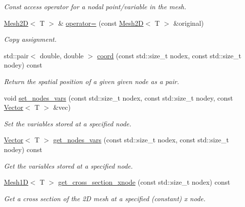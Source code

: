 \begin{DoxyCompactItemize}
\begin{DoxyCompactList}\small\item\em Const access operator for a nodal point/variable in the mesh. \end{DoxyCompactList}\item 
\hyperlink{classLuna_1_1Mesh2D}{Mesh2D}$<$ T $>$ \& \hyperlink{classLuna_1_1Mesh2D_a8bdd6247a49b7f148befc65937dfcc59}{operator=} (const \hyperlink{classLuna_1_1Mesh2D}{Mesh2D}$<$ T $>$ \&original)
\begin{DoxyCompactList}\small\item\em Copy assignment. \end{DoxyCompactList}\item 
std\+::pair$<$ double, double $>$ \hyperlink{classLuna_1_1Mesh2D_add4d12155922731ccf59fe4454699eed}{coord} (const std\+::size\+\_\+t nodex, const std\+::size\+\_\+t nodey) const
\begin{DoxyCompactList}\small\item\em Return the spatial position of a given given node as a pair. \end{DoxyCompactList}\item 
void \hyperlink{classLuna_1_1Mesh2D_a40ceeeb39bb653c05a4b5c084e676e34}{set\+\_\+nodes\+\_\+vars} (const std\+::size\+\_\+t nodex, const std\+::size\+\_\+t nodey, const \hyperlink{classLuna_1_1Vector}{Vector}$<$ T $>$ \&vec)
\begin{DoxyCompactList}\small\item\em Set the variables stored at a specified node. \end{DoxyCompactList}\item 
\hyperlink{classLuna_1_1Vector}{Vector}$<$ T $>$ \hyperlink{classLuna_1_1Mesh2D_ae91c7515960ecedf43e4ed3f411080a1}{get\+\_\+nodes\+\_\+vars} (const std\+::size\+\_\+t nodex, const std\+::size\+\_\+t nodey) const
\begin{DoxyCompactList}\small\item\em Get the variables stored at a specified node. \end{DoxyCompactList}\item 
\hyperlink{classLuna_1_1Mesh1D}{Mesh1D}$<$ T $>$ \hyperlink{classLuna_1_1Mesh2D_ac6745e18c235492110c0b6e3a9f94351}{get\+\_\+cross\+\_\+section\+\_\+xnode} (const std\+::size\+\_\+t nodex) const
\begin{DoxyCompactList}\small\item\em Get a cross section of the 2D mesh at a specified (constant) x node. \end{DoxyCompactList}\item 

\end{DoxyCompactItemize}
